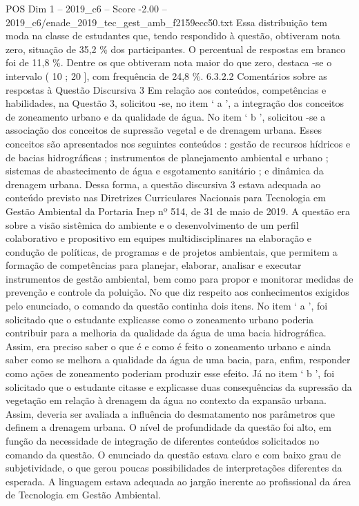 \begin{textsample}{POS Dim 1 – 2019\_c6 – Score -2.00 – 2019\_c6/enade\_2019\_tec\_gest\_amb\_f2159ecc50.txt}
Essa distribuição tem moda na classe de estudantes que, tendo respondido à questão, obtiveram nota zero, situação de 35,2 \% dos participantes.
O percentual de respostas em branco foi de 11,8 \%.
Dentre os que obtiveram nota maior do que zero, destaca -se o intervalo ( 10 ; 20 ], com frequência de 24,8 \%. 6.3.2.2 Comentários sobre as respostas à Questão Discursiva 3 Em relação aos conteúdos, competências e habilidades, na Questão 3, solicitou -se, no item ‘ a ’, a integração dos conceitos de zoneamento urbano e da qualidade de água.
No item ‘ b ’, solicitou -se a associação dos conceitos de supressão vegetal e de drenagem urbana.
Esses conceitos são apresentados nos seguintes conteúdos : gestão de recursos hídricos e de bacias hidrográficas ; instrumentos de planejamento ambiental e urbano ; sistemas de abastecimento de água e esgotamento sanitário ; e dinâmica da drenagem urbana.
Dessa forma, a questão discursiva 3 estava adequada ao conteúdo previsto nas Diretrizes Curriculares Nacionais para Tecnologia em Gestão Ambiental da Portaria Inep nº 514, de 31 de maio de 2019.
A questão era sobre a visão sistêmica do ambiente e o desenvolvimento de um perfil colaborativo e propositivo em equipes multidisciplinares na elaboração e condução de políticas, de programas e de projetos ambientais, que permitem a formação de competências para planejar, elaborar, analisar e executar instrumentos de gestão ambiental, bem como para propor e monitorar medidas de prevenção e controle da poluição.
No que diz respeito aos conhecimentos exigidos pelo enunciado, o comando da questão continha dois itens.
No item ‘ a ’, foi solicitado que o estudante explicasse como o zoneamento urbano poderia contribuir para a melhoria da qualidade da água de uma bacia hidrográfica.
Assim, era preciso saber o que é e como é feito o zoneamento urbano e ainda saber como se melhora a qualidade da água de uma bacia, para, enfim, responder como ações de zoneamento poderiam produzir esse efeito.
Já no item ‘ b ’, foi solicitado que o estudante citasse e explicasse duas consequências da supressão da vegetação em relação à drenagem da água no contexto da expansão urbana.
Assim, deveria ser avaliada a influência do desmatamento nos parâmetros que definem a drenagem urbana.
O nível de profundidade da questão foi alto, em função da necessidade de integração de diferentes conteúdos solicitados no comando da questão.
O enunciado da questão estava claro e com baixo grau de subjetividade, o que gerou poucas possibilidades de interpretações diferentes da esperada.
A linguagem estava adequada ao jargão inerente ao profissional da área de Tecnologia em Gestão Ambiental.

\end{textsample}
